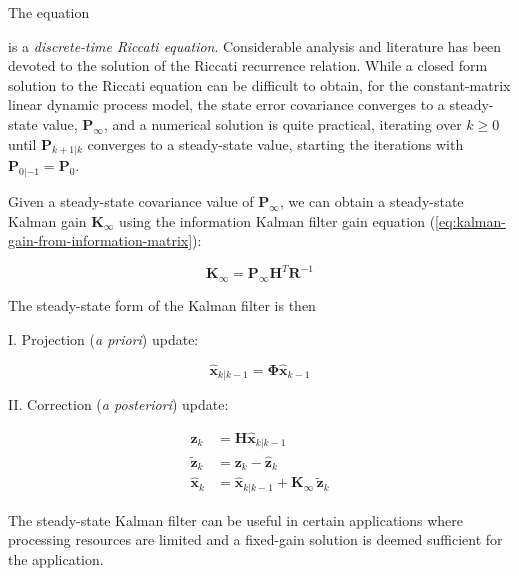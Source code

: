 The equation


is a \textit{discrete-time Riccati equation}. Considerable analysis and literature has
been devoted to the solution of the Riccati recurrence relation. While a closed form
solution to the Riccati equation can be difficult to obtain, for the constant-matrix
linear dynamic process model, the state error covariance converges to a steady-state
value, $\mathbf{P}_{\infty}$, and a numerical solution is quite practical, iterating
over $k \ge 0$ until $\mathbf{P}_{k+1|k}$ converges to a steady-state value, starting
the iterations with $\mathbf{P}_{0|-1} = \mathbf{P}_0$.

Given a steady-state covariance value of $\mathbf{P}_{\infty}$, we can obtain a
steady-state Kalman gain $\mathbf{K}_{\infty}$ using the information Kalman filter gain
equation (\ref{eq:kalman-gain-from-information-matrix}):

\begin{equation*}
    \mathbf{K}_{\infty} = \mathbf{P}_{\infty} \mathbf{H}^T \mathbf{R}^{-1}
\end{equation*}

The steady-state form of the Kalman filter is then

I. Projection (\textit{a priori}) update:

\begin{equation*}
    \hat{\mathbf{x}}_{k|k-1} = \mathbf{\Phi} \hat{\mathbf{x}}_{k-1}
\end{equation*}

II. Correction (\textit{a posteriori}) update:

\begin{equation*}
    \begin{aligned}
        \hat{\mathbf{z}}_k &= \mathbf{H} \hat{\mathbf{x}}_{k|k-1} \\
        \tilde{\mathbf{z}}_k &= \mathbf{z}_k - \hat{\mathbf{z}}_k \\
        \hat{\mathbf{x}}_k &= \hat{\mathbf{x}}_{k|k-1} +\mathbf{K}_{\infty} \, \tilde{\mathbf{z}}_k
    \end{aligned}
\end{equation*}

The steady-state Kalman filter can be useful in certain applications where processing
resources are limited and a fixed-gain solution is deemed sufficient for the application.

